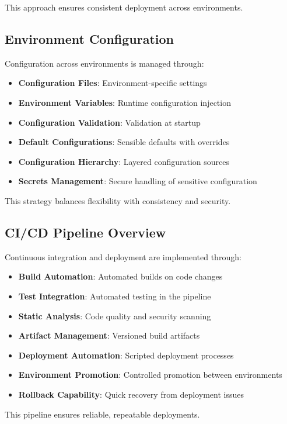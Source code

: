 This approach ensures consistent deployment across environments.

\subsection{Environment Configuration}
Configuration across environments is managed through:
\begin{itemize}
    \item \textbf{Configuration Files}: Environment-specific settings
    \item \textbf{Environment Variables}: Runtime configuration injection
    \item \textbf{Configuration Validation}: Validation at startup
    \item \textbf{Default Configurations}: Sensible defaults with overrides
    \item \textbf{Configuration Hierarchy}: Layered configuration sources
    \item \textbf{Secrets Management}: Secure handling of sensitive configuration
\end{itemize}

This strategy balances flexibility with consistency and security.

\subsection{CI/CD Pipeline Overview}
Continuous integration and deployment are implemented through:
\begin{itemize}
    \item \textbf{Build Automation}: Automated builds on code changes
    \item \textbf{Test Integration}: Automated testing in the pipeline
    \item \textbf{Static Analysis}: Code quality and security scanning
    \item \textbf{Artifact Management}: Versioned build artifacts
    \item \textbf{Deployment Automation}: Scripted deployment processes
    \item \textbf{Environment Promotion}: Controlled promotion between environments
    \item \textbf{Rollback Capability}: Quick recovery from deployment issues
\end{itemize}

This pipeline ensures reliable, repeatable deployments.

